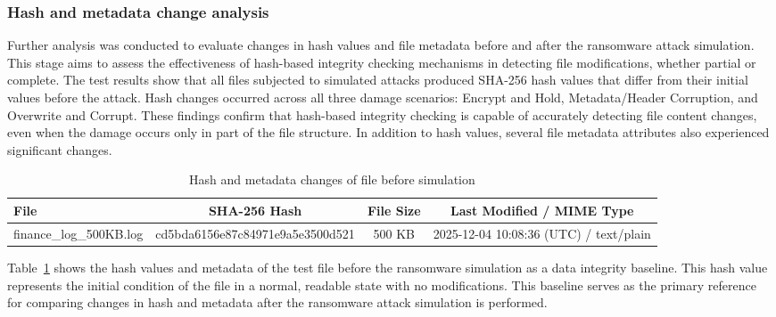 \documentclass{iaesarticle}
\begin{document}
\subsubsection{Hash and metadata change analysis}
Further analysis was conducted to evaluate changes in hash values and file metadata before and after the ransomware attack simulation. This stage aims to assess the effectiveness of hash-based integrity checking mechanisms in detecting file modifications, whether partial or complete. The test results show that all files subjected to simulated attacks produced SHA-256 hash values that differ from their initial values before the attack. Hash changes occurred across all three damage scenarios: Encrypt and Hold, Metadata/Header Corruption, and Overwrite and Corrupt. These findings confirm that hash-based integrity checking is capable of accurately detecting file content changes, even when the damage occurs only in part of the file structure. In addition to hash values, several file metadata attributes also experienced significant changes.

\begin{table}[H]
\centering
\fontsize{8pt}{10pt}\selectfont
\caption{Hash and metadata changes of file before simulation}
\label{tab:hash_before}
\begin{tabularx}{\textwidth}{@{}X c c c@{}}
\hline
\textbf{File} & \textbf{SHA-256 Hash} & \textbf{File Size} & \textbf{Last Modified / MIME Type} \\
\hline
finance\_log\_500KB.log & cd5bda6156e87c84971e9a5e3500d521 & 500 KB & 2025-12-04 10:08:36 (UTC) / text/plain \\
\hline
\end{tabularx}
\end{table}

Table~\ref{tab:hash_before} shows the hash values and metadata of the test file before the ransomware simulation as a data integrity baseline. This hash value represents the initial condition of the file in a normal, readable state with no modifications. This baseline serves as the primary reference for comparing changes in hash and metadata after the ransomware attack simulation is performed.
\end{document}
